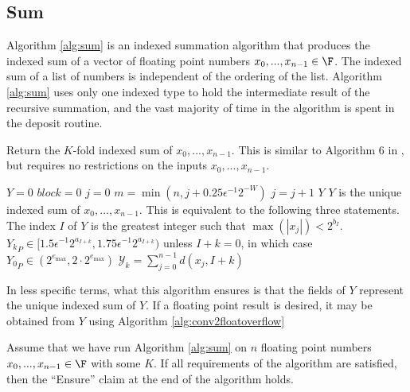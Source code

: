   \subsection{Sum}
    \label{sec:compositeops_sum}
    Algorithm \ref{alg:sum} is an indexed summation algorithm that produces the indexed sum of a vector of floating point numbers $x_0, ..., x_{n - 1} \in \F$.
    The indexed sum of a list of numbers is independent of the ordering of the list.
    Algorithm \ref{alg:sum} uses only one indexed type to hold the intermediate result of the recursive summation, and the vast majority of time in the algorithm is spent in the deposit routine.
    \begin{samepage}
    \begin{alg}
      Return the $K$-fold indexed sum of $x_0, ..., x_{n-1}$.
      This is similar to Algorithm $6$ in \cite{repsum}, but requires no restrictions on the inputs $x_0, ..., x_{n - 1}$.
      \begin{algorithmic}[1]
          \State $Y = 0$
          \State $block = 0$
          \State $j = 0$ \label{alg:sum:setj}
          \label{alg:sum:outerloop}
            \State $m = \min(n, j + 0.25\epsilon^{-1}2^{-W})$
            \State \Call{Update}{K, $\max([|x_j|, ..., |x_{m - 1}|)$, Y}\label{alg:sum:update}
              \State {}
              \State $j = j + 1$
            \EndWhile
            \State {}\label{alg:sum:renorm}
          \EndWhile
          \State \Return $Y$
        \EndFunction
        \Ensure
        \Statex $Y$ is the unique indexed sum of $x_0, ..., x_{n - 1}$. This is equivalent to the following three statements.
        \Statex The index $I$ of $Y$ is the greatest integer such that $\max(|x_j|) < 2^{b_I}$.
        \Statex ${Y_k}_P \in [1.5  \epsilon^{-1} 2^{a_{I + k}}, 1.75  \epsilon^{-1} 2^{a_{I + k}})$ unless $I + k = 0$, in which case ${Y_0}_P \in (2^{e_{\max}}, 2 \cdot 2^{e_{\max}})$
        \Statex $\mathcal{Y}_k = \sum\limits_{j = 0}^{n - 1}d(x_j, I + k)$
      \end{algorithmic}
      \label{alg:sum}
    \end{alg}
    \end{samepage}
    In less specific terms, what this algorithm ensures is that the fields of $Y$ represent the unique indexed sum of $Y$. If a floating point result is desired, it may be obtained from $Y$ using Algorithm \ref{alg:conv2floatoverflow}
    \begin{samepage}
    \begin{thm}
      Assume that we have run Algorithm \ref{alg:sum} on $n$ floating point numbers $x_0, ..., x_{n - 1} \in \F$ with some $K$. If all requirements of the algorithm are satisfied, then the ``Ensure'' claim at the end of the algorithm holds.
      \label{thm:sum}
    \end{thm}
    \end{samepage}
